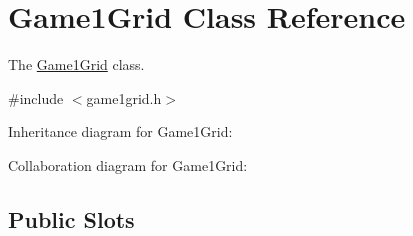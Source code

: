 \hypertarget{classGame1Grid}{}\section{Game1\+Grid Class Reference}
\label{classGame1Grid}


The \hyperlink{classGame1Grid}{Game1\+Grid} class.  




{\ttfamily \#include $<$game1grid.\+h$>$}



Inheritance diagram for Game1\+Grid\+:


Collaboration diagram for Game1\+Grid\+:
\subsection*{Public Slots}
